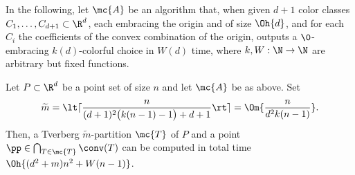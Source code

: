 In the following, let $\mc{A}$ be an algorithm that, when given $d+1$ 
color classes
$C_1,\dots,C_{d+1} \subset \R^d$, each embracing the origin and of size
$\Oh{d}$, and for each $C_i$ the coefficients of the convex combination 
of the origin, outputs a $\0$-embracing $k(d)$-colorful choice in 
$W(d)$ time, where $k, W: \N \rightarrow \N$ are arbitrary but fixed functions.

\begin{corollary}\label{cor:app:tverberg}
  Let $P \subset \R^d$ be a point set of size $n$ and let $\mc{A}$ 
  be as above.  Set
  \[
  \widetilde{m} = 
  \lt\lceil \frac{n}{(d+1)^2\big(k(n-1)-1\big)+d+1}\rt\rceil =
  \Om{\frac{n}{d^2k(n-1)}}.
  \]
  Then, a Tverberg $\widetilde{m}$-partition $\mc{T}$ of
  $P$ and a point $\pp \in \bigcap_{T \in \mc{T}}
  \conv(T)$ can be computed in total time $\Oh{(d^2 + m) n^2 + W(n-1)}$.
\end{corollary}
